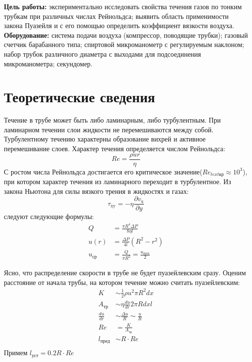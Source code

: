 \textbf{Цель работы:} экспериментально исследовать свойства течения 
газов по тонким трубкам при различных числах Рейнольдса; выявить область 
применимости закона Пуазейля и с его помощью определить коэффициент вязкости воздуха.
\\\indent\textbf{Оборудование:} система подачи воздуха (компрессор, поводящие трубки); 
газовый счетчик барабанного типа; спиртовой микроманометр с регулируемым наклоном; 
набор трубок различного диаметра с выходами для подсоединения микроманометра; секундомер.

\section*{Теоретические сведения}
\indent Течение в трубе может быть либо ламинарным, либо турбулентным. 
При ламинарном течении слои жидкости не перемешиваются между собой.
Турбулентному течению характерны образование вихрей и активное перемешивание
слоев. Характер течения определяется числом Рейнольдса:
\begin{equation}
    Re = \frac{\rho u r}{\eta}
\end{equation}
С ростом числа Рейнольдса достигается его критическое значение($Re_{text{кр}} \approx 10^3$), при котором
характер течения из ламинарного переходит в турбулентное.
\indent Из закона Ньютона для силы вязкого трения в жидкостях и газах:
\begin{equation}
    \tau_{\text{xy}} = -\eta\frac{\partial v_{\text{x}}}{\partial y}
\end{equation}
следуют следующие формулы:
\begin{align}
    Q &= \frac{\pi R^4 \Delta P}{8 \eta l}\\
    u(r) &= \frac{\Delta P}{4 l}(R^2 - r^2)\\
    u_{\text{ср}} &= \frac{Q}{\pi R^2} = \frac{u_{\text{max}}}{2}
\end{align}

Ясно, что распределение скорости в трубе не будет пуазейлевским сразу. 
Оценим расстояние от начала трубы, на котором течение можно считать 
пуазейлевским:
\begin{align*}
    K &\sim \frac{1}{2}\rho u^2 \pi R^2 dx\\
    A_{\text{тр}} &\sim \eta\frac{du}{dr} 2\pi R dx l\\
    \frac{du}{dr} &\sim \frac{\Delta u}{R} \sim \frac{u}{R}\\
    Re &= \frac{K}{A_{\text{тр}}}\\
    l_{\text{пред}} &\sim R \cdot Re \\
\end{align*}
Примем $l_{\text{уст}} = 0.2R \cdot Re$\\\indent

